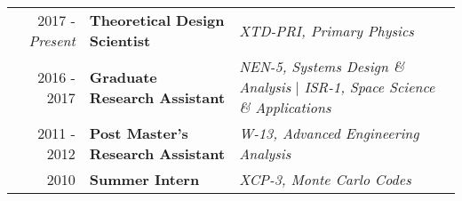 

\normalsize
{}

\begin{minipage}{\textwidth}
     \begin{tabular}{r|ll}
	     2017 - \emph{Present} & \textbf{Theoretical Design Scientist}  & \textit{XTD-PRI, Primary Physics}  \\
	     2016 - 2017 & \textbf{Graduate Research Assistant}  & \textit{NEN-5, Systems Design \& Analysis} | 
									     \textit{ISR-1, Space Science \& Applications} \\
	     2011 - 2012 & \textbf{Post Master's Research Assistant}  & \textit{W-13, Advanced Engineering Analysis} \\
	     2010 & \textbf{Summer Intern} & \textit{XCP-3, Monte Carlo Codes} \\
     \end{tabular}
\end{minipage}

